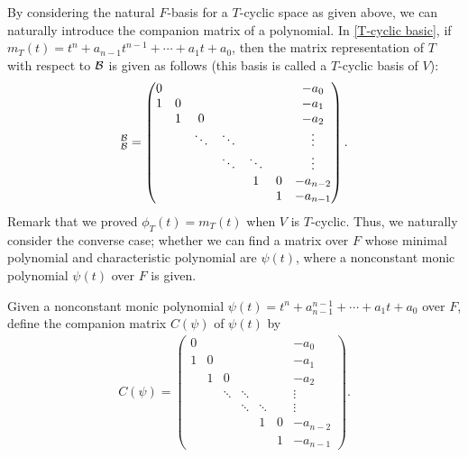 By considering the natural $F$-basis for a $T$-cyclic space as given above, we can naturally introduce the companion matrix of a polynomial.
In \cref{T-cyclic basic}, if $m_T(t)=t^n+a_{n-1}t^{n-1}+\cdots+a_1t+a_0$, then the matrix representation of $T$ with respect to ${\mathcal{B}}$ is given as follows (this basis is called a $T$-cyclic basis of $V$):
\begin{align*}
    [T]^{\mc{B}}_{\mc{B}}=\begin{pmatrix}
        0   &       &       &       &       &       &-a_0       \\
        1   &   0   &       &       &       &       &-a_1       \\
            &   1   &   0   &       &       &       &-a_2       \\
            &       &\ddots &\ddots &       &       &\vdots     \\
            &       &       &\ddots &\ddots &       &\vdots     \\
            &       &       &       &   1   &   0   &-a_{n-2}   \\
            &       &       &       &       &   1   &-a_{n-1}
    \end{pmatrix}.
\end{align*}
Remark that we proved $\phi_T(t)=m_T(t)$ when $V$ is $T$-cyclic.
Thus, we naturally consider the converse case; whether we can find a matrix over $F$ whose minimal polynomial and characteristic polynomial are $\psi(t)$, where a nonconstant monic polynomial $\psi(t)$ over $F$ is given.
\begin{defi}
    Given a nonconstant monic polynomial $\psi(t)=t^n+a_{n-1}^{n-1}+\cdots+a_1t+a_0$ over $F$, define the companion matrix $C(\psi)$ of $\psi(t)$ by
    \begin{align*}
        C(\psi)=\begin{pmatrix}
            0   &       &       &       &       &       &-a_0       \\
            1   &   0   &       &       &       &       &-a_1       \\
                &   1   &   0   &       &       &       &-a_2       \\
                &       &\ddots &\ddots &       &       &\vdots     \\
                &       &       &\ddots &\ddots &       &\vdots     \\
                &       &       &       &   1   &   0   &-a_{n-2}   \\
                &       &       &       &       &   1   &-a_{n-1}
        \end{pmatrix}.
    \end{align*}
\end{defi}

